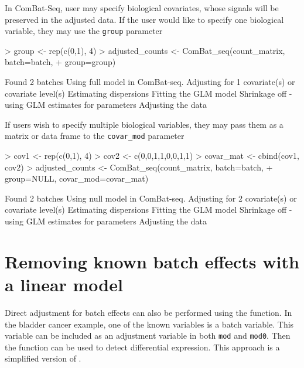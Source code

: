 \documentclass[12pt]{article}
\begin{document}
In ComBat-Seq, user may specify biological covariates, whose signals will be preserved in the adjusted data. If the user would like to specify one biological variable, they may use the \texttt{group} parameter

\begin{Schunk}
\begin{Sinput}
> group <- rep(c(0,1), 4)
> adjusted_counts <- ComBat_seq(count_matrix, batch=batch, 
+                               group=group)
\end{Sinput}
\begin{Soutput}
Found 2 batches
Using full model in ComBat-seq.
Adjusting for 1 covariate(s) or covariate level(s)
Estimating dispersions
Fitting the GLM model
Shrinkage off - using GLM estimates for parameters
Adjusting the data
\end{Soutput}
\end{Schunk}
  
If users wish to specify multiple biological variables, they may pass them as a matrix or data frame to the \texttt{covar\_mod} parameter

\begin{Schunk}
\begin{Sinput}
> cov1 <- rep(c(0,1), 4)
> cov2 <- c(0,0,1,1,0,0,1,1)
> covar_mat <- cbind(cov1, cov2)
> adjusted_counts <- ComBat_seq(count_matrix, batch=batch, 
+                               group=NULL, covar_mod=covar_mat)
\end{Sinput}
\begin{Soutput}
Found 2 batches
Using null model in ComBat-seq.
Adjusting for 2 covariate(s) or covariate level(s)
Estimating dispersions
Fitting the GLM model
Shrinkage off - using GLM estimates for parameters
Adjusting the data
\end{Soutput}
\end{Schunk}
  

\section{Removing known batch effects with a linear model}

Direct adjustment for batch effects can also be performed using the  function. In the bladder cancer example, one of the known variables is a batch variable. This variable can be included as an adjustment variable in both \texttt{mod} and \texttt{mod0}. Then the  function can be used to detect differential expression. This approach is a simplified version of .
\end{document}

